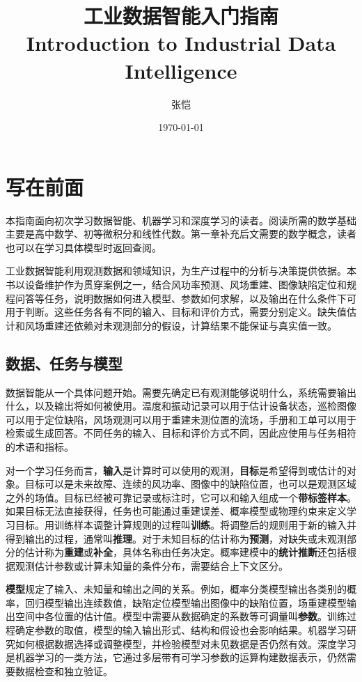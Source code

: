 \documentclass[UTF8,11pt,zihao=false,linespread=1.3,openany]{ctexbook}
\title{工业数据智能入门指南 \\ Introduction to Industrial Data Intelligence}
\author{张恺}
\date{\today}
\begin{document}
\maketitle
\frontmatter
\tableofcontents
\chapter*{写在前面}
本指南面向初次学习数据智能、机器学习和深度学习的读者。阅读所需的数学基础主要是高中数学、初等微积分和线性代数。第一章补充后文需要的数学概念，读者也可以在学习具体模型时返回查阅。

工业数据智能利用观测数据和领域知识，为生产过程中的分析与决策提供依据。本书以设备维护作为贯穿案例之一，结合风功率预测、风场重建、图像缺陷定位和规程问答等任务，说明数据如何进入模型、参数如何求解，以及输出在什么条件下可用于判断。这些任务各有不同的输入、目标和评价方式，需要分别定义。缺失值估计和风场重建还依赖对未观测部分的假设，计算结果不能保证与真实值一致。

\section*{数据、任务与模型}
数据智能从一个具体问题开始。需要先确定已有观测能够说明什么，系统需要输出什么，以及输出将如何被使用。温度和振动记录可以用于估计设备状态，巡检图像可以用于定位缺陷，风场观测可以用于重建未测位置的流场，手册和工单可以用于检索或生成回答。不同任务的输入、目标和评价方式不同，因此应使用与任务相符的术语和指标。

对一个学习任务而言，\textbf{输入}是计算时可以使用的观测，\textbf{目标}是希望得到或估计的对象。目标可以是未来故障、连续的风功率、图像中的缺陷位置，也可以是观测区域之外的场值。目标已经被可靠记录或标注时，它可以和输入组成一个\textbf{带标签样本}。如果目标无法直接获得，任务也可能通过重建误差、概率模型或物理约束来定义学习目标。用训练样本调整计算规则的过程叫\textbf{训练}。将调整后的规则用于新的输入并得到输出的过程，通常叫\textbf{推理}。对于未知目标的估计称为\textbf{预测}，对缺失或未观测部分的估计称为\textbf{重建}或\textbf{补全}，具体名称由任务决定。概率建模中的\textbf{统计推断}还包括根据观测估计参数或计算未知量的条件分布，需要结合上下文区分。

\textbf{模型}规定了输入、未知量和输出之间的关系。例如，概率分类模型输出各类别的概率，回归模型输出连续数值，缺陷定位模型输出图像中的缺陷位置，场重建模型输出空间中各位置的估计值。模型中需要从数据确定的系数等可调量叫\textbf{参数}。训练过程确定参数的取值，模型的输入输出形式、结构和假设也会影响结果。机器学习研究如何根据数据选择或调整模型，并检验模型对未见数据是否仍然有效。深度学习是机器学习的一类方法，它通过多层带有可学习参数的运算构建数据表示，仍然需要数据检查和独立验证。
\end{document}
